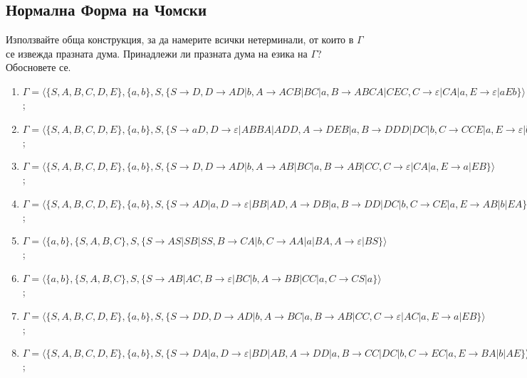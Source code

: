 \subsection{Нормална Форма на Чомски}

\begin{problem}
Използвайте обща конструкция, за да намерите всички нетерминали, от които в $\Gamma$ се извежда празната дума.
Принадлежи ли празната дума на езика на $\Gamma$? Обосновете се.

\begin{enumerate}
\item
$\Gamma=\langle\{S,A,B,C,D,E\},\{a,b\},S,\{S\rightarrow D,D\rightarrow AD|b,A\rightarrow ACB|BC|a, B\rightarrow ABCA|CEC,C\rightarrow \varepsilon|CA|a, E\rightarrow \varepsilon|aEb\}\rangle$;
\item
$\Gamma=\langle\{S,A,B,C,D,E\},\{a,b\},S,\{S \rightarrow aD, D\rightarrow \varepsilon|ABBA|ADD,A\rightarrow DEB|a,B\rightarrow DDD|DC|b,C\rightarrow CCE|a, E\rightarrow \varepsilon|bEa\}\rangle$;
\item
$\Gamma=\langle\{S,A,B,C,D,E\},\{a,b\},S,\{ S\rightarrow D,D\rightarrow AD|b,A\rightarrow AB|BC|a, B\rightarrow AB|CC, C\rightarrow \varepsilon|CA|a, E\rightarrow a|EB\}\rangle$;
\item
$\Gamma=\langle\{S,A,B,C,D,E\},\{a,b\},S,\{ S \rightarrow AD|a, D\rightarrow \varepsilon|BB|AD,A\rightarrow DB|a,  B\rightarrow DD|DC|b,C\rightarrow CE|a, E\rightarrow AB|b|EA\}\rangle$;
\item
$\Gamma=\langle\{a,b\},\{S,A,B,C\},S,\{S\rightarrow AS|SB|SS,B\rightarrow CA|b, C\rightarrow AA|a|BA,A\rightarrow \varepsilon|BS\}\rangle$;
\item
$\Gamma=\langle\{a,b\},\{S,A,B,C\},S,\{S\rightarrow AB|AC,B\rightarrow \varepsilon |BC|b,A\rightarrow BB|CC|a,
C\rightarrow CS|a\}\rangle$;

\item
$\Gamma=\langle\{S,A,B,C,D,E\},\{a,b\},S,\{S\rightarrow DD,D\rightarrow AD|b,A\rightarrow BC|a,B\rightarrow AB|CC, C\rightarrow \varepsilon|AC|a, E\rightarrow a|EB\}\rangle$;

\item
$\Gamma=\langle\{S,A,B,C,D,E\},\{a,b\},S,\{S \rightarrow DA|a, D\rightarrow \varepsilon|BD|AB,A\rightarrow DD|a, B\rightarrow CC|DC|b, C\rightarrow EC|a, E\rightarrow BA|b|AE\}\rangle$;
\end{enumerate}
\end{problem}


